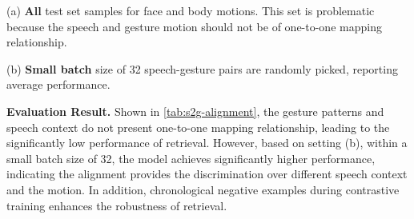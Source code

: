 (a) \textbf{All} test set samples for face and body motions. This set is problematic because the speech and gesture motion should not be of one-to-one mapping relationship.

(b) \textbf{Small batch} size of 32 speech-gesture pairs are randomly picked, reporting average performance.

\noindent\textbf{Evaluation Result.}
Shown in \cref{tab:s2g-alignment}, the gesture patterns and speech context do not present one-to-one mapping relationship, leading to the significantly low performance of retrieval. However, based on setting (b), within a small batch size of 32, the model achieves significantly higher performance, indicating the alignment provides the discrimination over different speech context and the motion. In addition, chronological negative examples during contrastive training enhances the robustness of retrieval.

